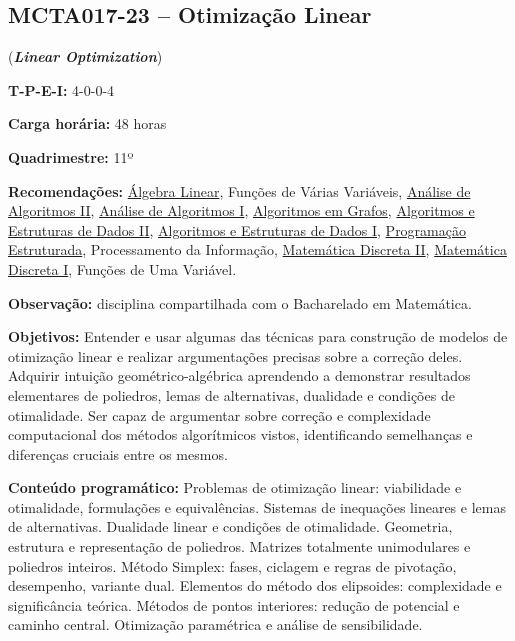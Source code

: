 \documentclass[class=article, crop=false]{standalone}
\begin{document}
\subsection{MCTA017-23 -- Otimização Linear}
\label{disc:ol}

(\textbf{\textit{Linear Optimization}})

\begin{center}
    \begin{minipage}{0.85\textwidth}
        \textbf{T-P-E-I:} 4-0-0-4
        
        \textbf{Carga horária:} 48 horas
        
        \textbf{Quadrimestre:} 11º 
        
        \textbf{Recomendações:}
        \hyperref[disc:alge_lin]{Álgebra Linear},
        Funções de Várias Variáveis,
        \hyperref[disc:aaII]{Análise de Algoritmos II},
        \hyperref[disc:aaI]{Análise de Algoritmos I},
        \hyperref[disc:ag]{Algoritmos em Grafos},
        \hyperref[disc:aedII]{Algoritmos e Estruturas de Dados II},
        \hyperref[disc:aedI]{Algoritmos e Estruturas de Dados I},
        \hyperref[disc:pe]{Programação Estruturada},
        Processamento da Informação,
        \hyperref[disc:mdII]{Matemática Discreta II},
        \hyperref[disc:mdI]{Matemática Discreta I},
        Funções de Uma Variável.
        
        \textbf{Observação:} disciplina compartilhada com o Bacharelado em Matemática.
    \end{minipage}
\end{center}

\textbf{Objetivos:}
Entender e usar algumas das técnicas para construção de modelos de otimização
linear e realizar argumentações precisas sobre a correção deles. Adquirir
intuição geométrico-algébrica aprendendo a demonstrar resultados elementares de
poliedros, lemas de alternativas, dualidade e condições de otimalidade. Ser
capaz de argumentar sobre correção e complexidade computacional dos métodos
algorítmicos vistos, identificando semelhanças e diferenças cruciais entre os
mesmos.

\textbf{Conteúdo programático:} 
Problemas de otimização linear: viabilidade e otimalidade, formulações e equivalências.
Sistemas de inequações lineares e lemas de alternativas. 
Dualidade linear e condições de otimalidade.
Geometria, estrutura e representação de poliedros.
Matrizes totalmente unimodulares e poliedros inteiros.
Método Simplex: fases, ciclagem e regras de pivotação, desempenho, variante dual.
Elementos do método dos elipsoides: complexidade e significância teórica.
Métodos de pontos interiores: redução de potencial e caminho central.
Otimização paramétrica e análise de sensibilidade.
\end{document}
